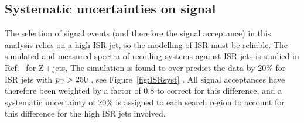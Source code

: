 \subsection{Systematic uncertainties on signal}
\label{sec:signalSYST}


The selection of signal events (and therefore the signal acceptance) in this analysis relies on a high-\pt ISR jet, so the modelling of ISR must be reliable.
The \MADGRAPH{} simulated and measured \pt spectra of recoiling systems against ISR jets is studied in Ref.~\cite{CMSsinglelep} for Z\,+\,jets, 
\ttbar {}
The simulation is found to over predict the data by 20\% for ISR jets with $p_{\text{T}} > 250$ \GeV, see Figure~\ref{fig:ISRsyst} 
.
All signal acceptances have therefore been weighted by a factor of 0.8 to correct for this difference, and a systematic uncertainty of 20\% is assigned to each search region to account for this difference for the high \pt ISR jets involved.

